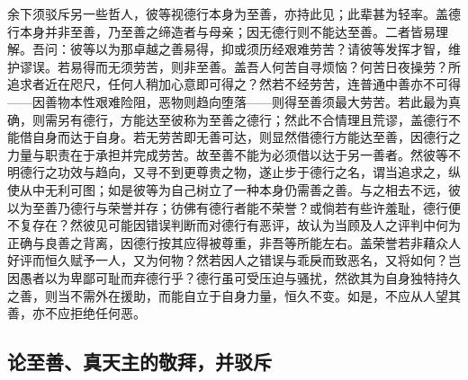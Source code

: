 余下须驳斥另一些哲人，彼等视德行本身为至善，亦持此见；此辈甚为轻率。盖德行本身并非至善，乃至善之缔造者与母亲；因无德行则不能达至善。二者皆易理解。吾问：彼等以为那卓越之善易得，抑或须历经艰难劳苦？请彼等发挥才智，维护谬误。若易得而无须劳苦，则非至善。盖吾人何苦自寻烦恼？何苦日夜操劳？所追求者近在咫尺，任何人稍加心意即可得之？然若不经劳苦，连普通中善亦不可得——因善物本性艰难险阻，恶物则趋向堕落——则得至善须最大劳苦。若此最为真确，则需另有德行，方能达至彼称为至善之德行；然此不合情理且荒谬，盖德行不能借自身而达于自身。若无劳苦即无善可达，则显然借德行方能达至善，因德行之力量与职责在于承担并完成劳苦。故至善不能为必须借以达于另一善者。然彼等不明德行之功效与趋向，又寻不到更尊贵之物，遂止步于德行之名，谓当追求之，纵使从中无利可图；如是彼等为自己树立了一种本身仍需善之善。与之相去不远，彼以为至善乃德行与荣誉并存；彷佛有德行者能不荣誉？或倘若有些许羞耻，德行便不复存在？然彼见可能因错误判断而对德行有恶评，故认为当顾及人之评判中何为正确与良善之背离，因德行按其应得被尊重，非吾等所能左右。盖荣誉若非藉众人好评而恒久赋予一人，又为何物？然若因人之错误与乖戾而致恶名，又将如何？岂因愚者以为卑鄙可耻而弃德行乎？德行虽可受压迫与骚扰，然欲其为自身独特持久之善，则当不需外在援助，而能自立于自身力量，恒久不变。如是，不应从人望其善，亦不应拒绝任何恶。\par


\subsection{论至善、真天主的敬拜，并驳斥}

